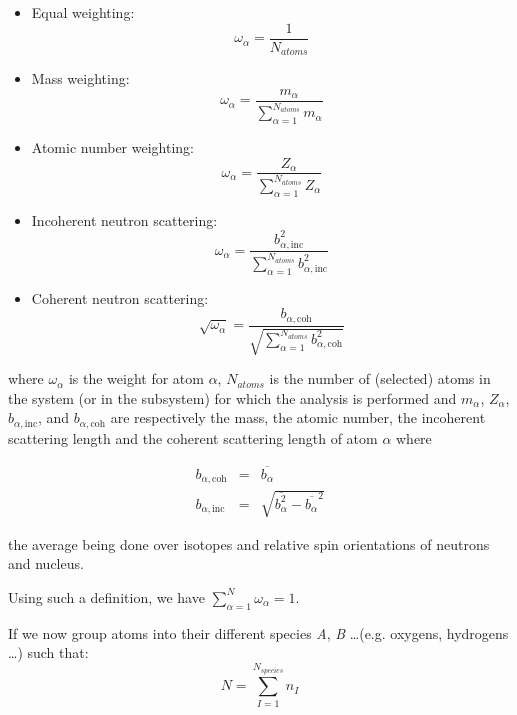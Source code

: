 \documentclass[a4paper,11pt]{report}
\begin{document}
\begin{itemize}
\item Equal weighting:
\begin{equation}
\label{eq:equal}
\omega_{\alpha}=\frac{1}{N_{atoms}}
\end{equation}
\item Mass weighting: 
\begin{equation}
\label{eq:mass}
\omega_{\alpha}=\frac{m_\alpha}{\sum_{\alpha=1}^{N_{atoms}} m_\alpha}
\end{equation}
\item Atomic number weighting: 
\begin{equation}
\label{eq:atomic_number}
\omega_{\alpha}=\frac{Z_\alpha}{\sum_{\alpha=1}^{N_{atoms}} Z_\alpha}
\end{equation}
\item Incoherent neutron scattering: 
\begin{equation}
\label{eq:incoherent}
\omega_{\alpha}=\frac{b_{\alpha,\mathrm{inc}}^2}{\sum_{\alpha=1}^{N_{atoms}} b_{\alpha,\mathrm{inc}}^2}
\end{equation}
\item Coherent neutron scattering: 
\begin{equation}
\label{eq:coherent}
\sqrt{\omega_{\alpha}}=\frac{b_{\alpha,\mathrm{coh}}}{\sqrt{\sum_{\alpha=1}^{N_{atoms}} b_{\alpha,\mathrm{coh}}^2}}
\end{equation}
\end{itemize}

where $\omega_\alpha$ is the weight for atom $\alpha$, $N_{atoms}$ is the number of (selected) atoms in the system (or in 
the subsystem) for which the analysis is performed and $m_\alpha$, $Z_\alpha$, $b_{\alpha,\mathrm{inc}}$, and $b_{\alpha,\mathrm{coh}}$ are respectively the 
mass, the atomic number, the incoherent scattering length and the coherent scattering length of atom $\alpha$ where

\begin{eqnarray}
b_{\alpha,\mathrm{coh}}&=&\overline{b_\alpha} \\
b_{\alpha,\mathrm{inc}}&=&\sqrt{\overline{b_\alpha^2}-\overline{b_\alpha}^2}
\end{eqnarray} 

the average being done over isotopes and relative spin orientations of neutrons and nucleus. 

Using such a definition, we have $\sum_{\alpha=1}^N \omega_\alpha=1$.

If we now group atoms into their different species \textit{A}, \textit{B} \ldots (e.g. oxygens, hydrogens \ldots ) such that:
\begin{equation}
N = \sum^{N_{species}}_{I = 1}n_I
\end{equation}
\end{document}

